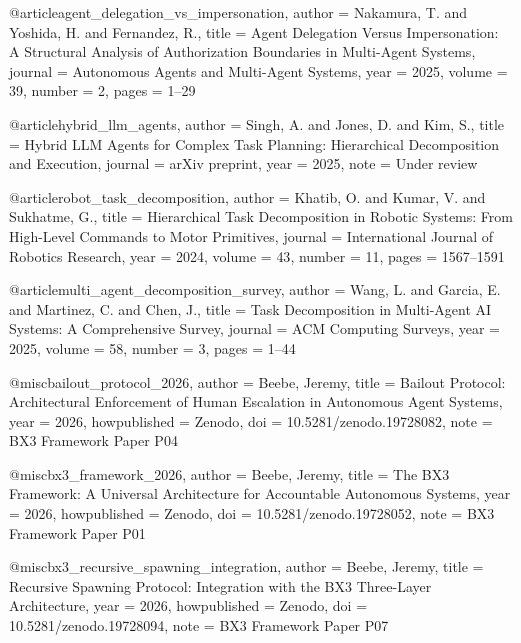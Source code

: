 @article{agent_delegation_vs_impersonation,
  author = {Nakamura, T. and Yoshida, H. and Fernandez, R.},
  title = {Agent Delegation Versus Impersonation: A Structural Analysis of Authorization Boundaries in Multi-Agent Systems},
  journal = {Autonomous Agents and Multi-Agent Systems},
  year = {2025},
  volume = {39},
  number = {2},
  pages = {1--29}
}

@article{hybrid_llm_agents,
  author = {Singh, A. and Jones, D. and Kim, S.},
  title = {Hybrid LLM Agents for Complex Task Planning: Hierarchical Decomposition and Execution},
  journal = {arXiv preprint},
  year = {2025},
  note = {Under review}
}

@article{robot_task_decomposition,
  author = {Khatib, O. and Kumar, V. and Sukhatme, G.},
  title = {Hierarchical Task Decomposition in Robotic Systems: From High-Level Commands to Motor Primitives},
  journal = {International Journal of Robotics Research},
  year = {2024},
  volume = {43},
  number = {11},
  pages = {1567--1591}
}

@article{multi_agent_decomposition_survey,
  author = {Wang, L. and Garcia, E. and Martinez, C. and Chen, J.},
  title = {Task Decomposition in Multi-Agent AI Systems: A Comprehensive Survey},
  journal = {ACM Computing Surveys},
  year = {2025},
  volume = {58},
  number = {3},
  pages = {1--44}
}

@misc{bailout_protocol_2026,
  author = {Beebe, Jeremy},
  title = {Bailout Protocol: Architectural Enforcement of Human Escalation in Autonomous Agent Systems},
  year = {2026},
  howpublished = {Zenodo},
  doi = {10.5281/zenodo.19728082},
  note = {BX3 Framework Paper P04}
}

@misc{bx3_framework_2026,
  author = {Beebe, Jeremy},
  title = {The BX3 Framework: A Universal Architecture for Accountable Autonomous Systems},
  year = {2026},
  howpublished = {Zenodo},
  doi = {10.5281/zenodo.19728052},
  note = {BX3 Framework Paper P01}
}

@misc{bx3_recursive_spawning_integration,
  author = {Beebe, Jeremy},
  title = {Recursive Spawning Protocol: Integration with the BX3 Three-Layer Architecture},
  year = {2026},
  howpublished = {Zenodo},
  doi = {10.5281/zenodo.19728094},
  note = {BX3 Framework Paper P07}
}
